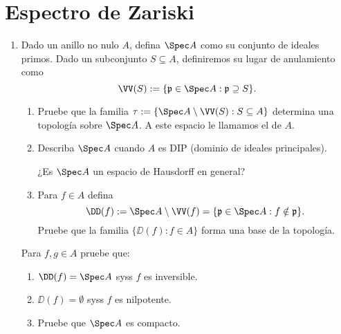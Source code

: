 \documentclass[11pt, reqno]{amsart}
\begin{document}
\section{Espectro de Zariski}
\begin{enumerate}
	\item Dado un anillo no nulo $A$, defina $\Spec A$ como su conjunto de ideales primos.
		Dado un subconjunto $S \subseteq A$, definiremos su lugar de anulamiento como
		\[
			\VV(S) := \{ \mathfrak{p} \in \Spec A : \mathfrak{p} \supseteq S \}.
		\]
		\begin{enumerate}
			\item Pruebe que la familia $\tau := \{ \Spec A \setminus \VV(S) : S \subseteq A \}$ determina
				una topología sobre $\Spec A$.
				A este espacio le llamamos el  de $A$.
			\item Describa $\Spec A$ cuando $A$ es DIP (dominio de ideales principales).

				\lookup
				¿Es $\Spec A$ un espacio de Hausdorff en general?
			\item Para $f \in A$ defina
				\[
					\DD(f) := \Spec A \setminus \VV(f) = \{ \mathfrak{p} \in \Spec A : f \notin \mathfrak{p} \}.
				\]
				Pruebe que la familia $\{ \DD(f) : f\in A \}$ forma una base de la topología.
		\end{enumerate}
		Para $f, g \in A$ pruebe que:
		\begin{enumerate}[resume]
			\item $\DD(f) = \Spec A$ syss $f$ es inversible.
			\item $\DD(f) = \emptyset$ syss $f$ es nilpotente.
			\item\lookst
				Pruebe que $\Spec A$ es compacto.


\end{enumerate}
\end{enumerate}
\end{document}

